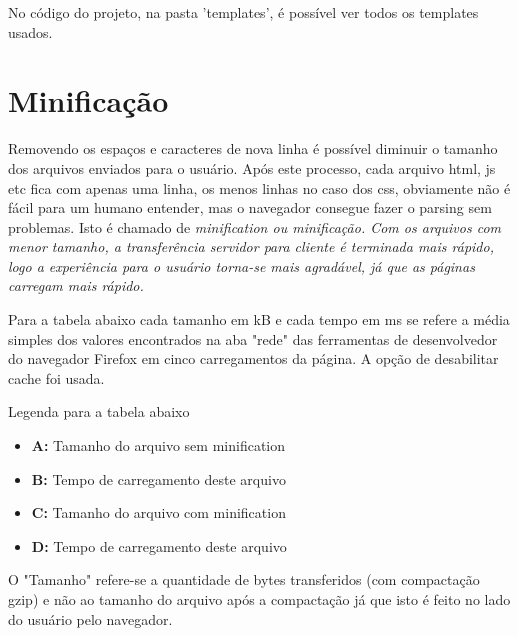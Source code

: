 No código do projeto, na pasta 'templates', é possível ver todos os templates usados.

\section{Minificação}

Removendo os espaços e caracteres de nova linha é possível diminuir o tamanho dos arquivos enviados
para o usuário. Após este processo, cada arquivo html, js etc fica com apenas uma linha, os menos linhas
no caso dos css, obviamente não é fácil para um humano entender, mas o navegador consegue fazer o 
parsing sem problemas. Isto é chamado de \em{minification} ou minificação. Com os arquivos
com menor tamanho, a transferência servidor para cliente é terminada mais rápido, logo a experiência
para o usuário torna-se mais agradável, já que as páginas carregam mais rápido.

Para a tabela abaixo cada tamanho em kB e cada tempo em ms se refere a média simples dos valores 
encontrados na aba "rede" das ferramentas de desenvolvedor do navegador Firefox em cinco 
carregamentos da página. A opção de desabilitar cache foi usada.

Legenda para a tabela abaixo
\begin{itemize}
\item \textbf{A:} Tamanho do arquivo sem minification
\item \textbf{B:} Tempo de carregamento deste arquivo
\item \textbf{C:} Tamanho do arquivo com minification
\item \textbf{D:} Tempo de carregamento deste arquivo
\end {itemize}

O "Tamanho" refere-se a quantidade de bytes transferidos (com compactação gzip) e não ao 
tamanho do arquivo após a compactação já que isto é feito no lado do usuário pelo navegador.

